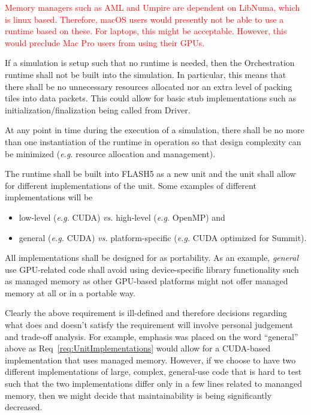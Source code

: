 \documentclass{article}
\begin{document}
\textcolor{red}{Memory managers such as AML and Umpire are dependent on
LibNuma, which is linux based.  Therefore, macOS users would presently not be
able to use a runtime based on these.  For laptops, this might be acceptable.
However, this would preclude Mac Pro users from using their GPUs.}

\begin{req}
If a simulation is setup such that no runtime is needed, then the Orchestration
runtime shall not be built into the simulation.  In particular, this means that
there shall be no unnecessary resources allocated nor an extra level of packing
tiles into data packets.  This could allow for basic stub implementations such
as initialization/finalization being called from Driver.
\end{req}

\begin{req}
At any point in time during the execution of a simulation, there shall be no more
than one instantiation of the runtime in operation so that design complexity can
be minimized (\textit{e.g.} resource allocation and management).
\end{req}

\begin{req}
\label{req:UnitImplementations}
The runtime shall be built into FLASH5 as a new unit and the unit shall allow
for different implementations of the unit.  Some examples of different
implementations will be
\begin{itemize}
\item{low-level (\textit{e.g.} CUDA) \textit{vs.} high-level
(\textit{e.g.} OpenMP) and}
\item{general (\textit{e.g.} CUDA) \textit{vs.}} platform-specific
(\textit{e.g.} CUDA optimized for Summit).
\end{itemize}
\end{req}

\begin{req}
All implementations shall be designed for as portability.  As an example,
\textit{general} use GPU-related code shall avoid using device-specific library
functionality such as managed memory as other GPU-based platforms might not
offer managed memory at all or in a portable way.
\end{req}

Clearly the above requirement is ill-defined and therefore decisions regarding
what does and doesn't satisfy the requirement will involve personal judgement
and trade-off analysis.  For example, emphasis was placed on the word
``general'' above as Req~\ref{req:UnitImplementations} would allow for a
CUDA-based implementation that uses managed memory.  However, if we choose to
have two different implementations of large, complex, general-use code that is
hard to test such that the two implementations differ only in a few lines
related to mananged memory, then we might decide that maintainability is being
significantly decreased.
\end{document}
